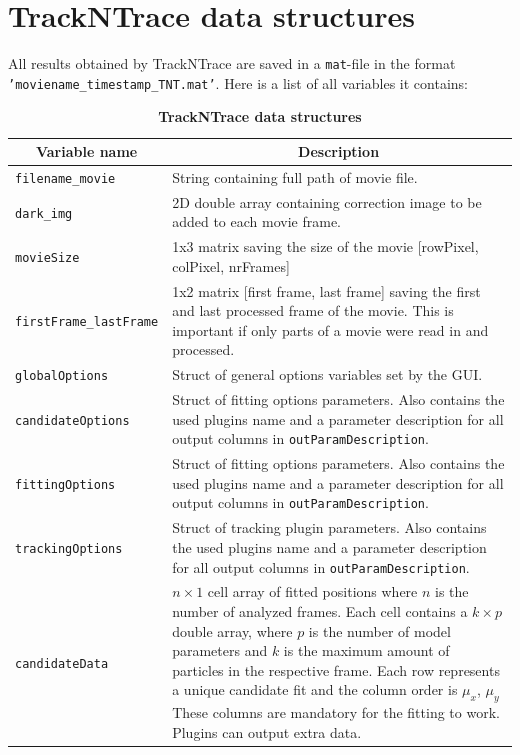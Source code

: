\documentclass[11pt,onside]{report}
\numberwithin{equation}{chapter}
\begin{document}
\section{TrackNTrace data structures}\label{sec:datastructures}
All results obtained by TrackNTrace are saved in a \texttt{mat}-file in the format \texttt{'moviename\_timestamp\_TNT.mat'}. Here is a list of all variables it contains:
\begin{table}[!h]
\centering
\caption*{\textbf{TrackNTrace data structures}}
\label{tab:datastruct}
\begin{tabular}{p{} p{}}
\toprule
\multicolumn{1}{c}{Variable name} & \multicolumn{1}{c}{Description}\\ \midrule
\texttt{filename\_movie} & String containing full path of movie file. \\[5pt]
\texttt{dark\_img} & 2D double array containing correction image to be added to each movie frame. \\[5pt]
\texttt{movieSize} & 1x3 matrix saving the size of the movie [rowPixel, colPixel, nrFrames] \\[5pt]
\texttt{firstFrame\_lastFrame} & 1x2 matrix [first frame, last frame] saving the first and last processed frame of the movie. This is important if only parts of a movie were read in and processed. \\[5pt]
\texttt{globalOptions} & Struct of general options variables set by the GUI. \\[5pt]
\texttt{candidateOptions} & Struct of fitting options parameters. Also contains the used plugins name and a parameter description for all output columns in \texttt{outParamDescription}. \\[5pt]
\texttt{fittingOptions} & Struct of fitting options parameters. Also contains the used plugins name and a parameter description for all output columns in \texttt{outParamDescription}. \\[5pt]
\texttt{trackingOptions} & Struct of tracking plugin parameters. Also contains the used plugins name and a parameter description for all output columns in \texttt{outParamDescription}. \\[5pt]
\texttt{candidateData} & $n\times 1$ cell array of fitted positions where $n$ is the number of analyzed frames. Each cell contains a $k\times p$ double array, where $p$ is the number of model parameters and $k$ is the maximum amount of particles in the respective frame. Each row represents a unique candidate fit and the column order is $\mu_x$, $\mu_y$These columns are mandatory for the fitting to work. Plugins can output extra data.\\

\end{tabular}
\end{table}
\end{document}
